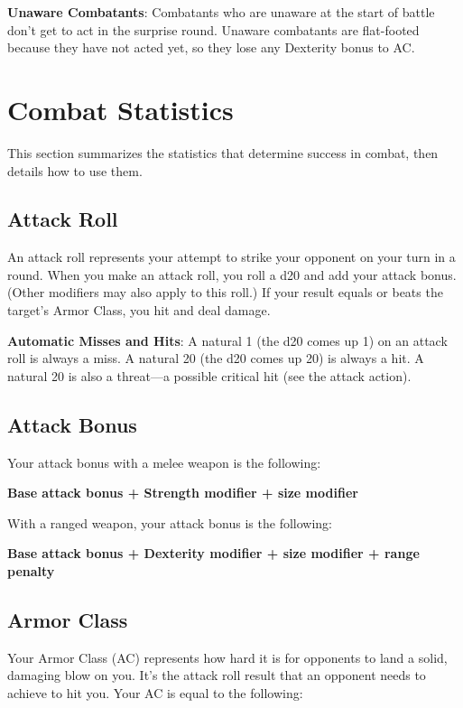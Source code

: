 \textbf{Unaware Combatants}: Combatants who are unaware at the start of battle don't get to act in the surprise round. Unaware combatants are flat-footed because they have not acted yet, so they lose any Dexterity bonus to AC.
				
\section{Combat Statistics}

				
This section summarizes the statistics that determine success in combat, then details how to use them.
				
\subsection{Attack Roll}

				
An attack roll represents your attempt to strike your opponent on your turn in a round. When you make an attack roll, you roll a d20 and add your attack bonus. (Other modifiers may also apply to this roll.) If your result equals or beats the target's Armor Class, you hit and deal damage.
				
\textbf{Automatic Misses and Hits}: A natural 1 (the d20 comes up 1) on an attack roll is always a miss. A natural 20 (the d20 comes up 20) is always a hit. A natural 20 is also a threat---a possible critical hit (see the attack action).
				
\subsection{Attack Bonus}

				
Your attack bonus with a melee weapon is the following:
				
{\large \textbf{Base attack bonus + Strength modifier + size modifier}}
				
With a ranged weapon, your attack bonus is the following:
				
{\large \textbf{Base attack bonus + Dexterity modifier + size modifier + range penalty}}
								
\subsection{Armor Class}

				
Your Armor Class (AC) represents how hard it is for opponents to land a solid, damaging blow on you. It's the attack roll result that an opponent needs to achieve to hit you. Your AC is equal to the following: 
				
